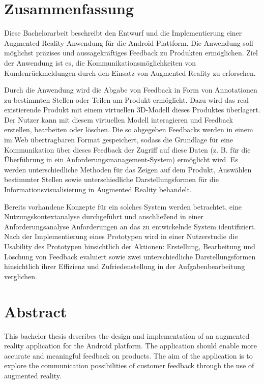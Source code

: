 \section*{Zusammenfassung}

Diese Bachelorarbeit beschreibt den Entwurf und die Implementierung einer Augmented Reality Anwendung für die Android Plattform. Die Anwendung soll möglichst präzises und aussagekräftiges Feedback zu Produkten ermöglichen.
Ziel der Anwendung ist es, die Kommunikationsmöglichkeiten von Kundenrückmeldungen durch den Einsatz von Augmented Reality zu erforschen.

Durch die Anwendung wird die Abgabe von Feedback in Form von Annotationen zu bestimmten Stellen oder Teilen am Produkt ermöglicht. Dazu wird das real existierende Produkt mit einem 
virtuellen 3D-Modell dieses Produktes überlagert. Der Nutzer kann mit diesem virtuellen Modell interagieren und Feedback erstellen, bearbeiten oder löschen. Die so abgegeben Feedbacks werden 
in einem im Web übertragbaren Format gespeichert, sodass die Grundlage für eine Kommunikation über dieses Feedback der Zugriff auf diese Daten (z. B. für die Überführung in ein Anforderungsmanagement-System) 
ermöglicht wird. Es werden unterschiedliche Methoden für das Zeigen auf dem Produkt, Auswählen bestimmter Stellen sowie unterschiedliche Darstellungsformen für die Informationsvisualisierung in Augmented Reality 
behandelt. 

Bereits vorhandene Konzepte für ein solches System werden betrachtet, eine Nutzungskontextanalyse durchgeführt und anschließend in einer Anforderungsanalyse Anforderungen an das zu entwickelnde System identifiziert. 
Nach der Implementierung eines Prototypen wird in einer Nutzerstudie die Usability des Prototypen hinsichtlich der Aktionen: Erstellung, Bearbeitung und Löschung von Feedback evaluiert sowie zwei unterschiedliche
Darstellungsformen hinsichtlich ihrer Effizienz und Zufriedenstellung in der Aufgabenbearbeitung verglichen.

\section*{Abstract}

This bachelor thesis describes the design and implementation of an augmented reality application for the Android platform. The application should enable more accurate and meaningful feedback on products.
The aim of the application is to explore the communication possibilities of customer feedback through the use of augmented reality.

